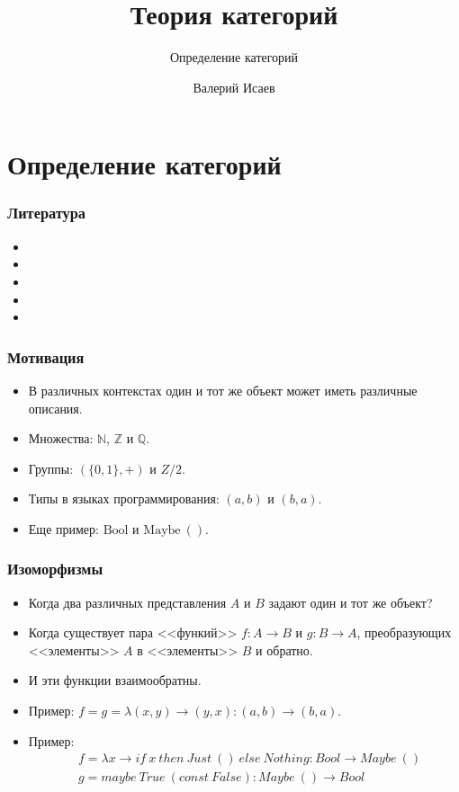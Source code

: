 \documentclass{beamer}
\newcommand{\fs}[1]{\mathrm{#1}}
\begin{document}
\title{Теория категорий}
\subtitle{Определение категорий}
\author{Валерий Исаев}
\maketitle

\section{Определение категорий}

\begin{frame}

\frametitle{Литература}
\begin{itemize}
\item {}
\item {}
\item {}
\item {}
\item {}
\end{itemize}
\end{frame}

\begin{frame}
\frametitle{Мотивация}
\begin{itemize}
\item В различных контекстах один и тот же объект может иметь различные описания.
\item Множества: $\mathbb{N}$, $\mathbb{Z}$ и $\mathbb{Q}$.
\item Группы: $(\{ 0, 1 \}, +)$ и $Z/2$.
\item Типы в языках программирования: $(a, b)$ и $(b, a)$.
\item Еще пример: $\fs{Bool}$ и $\fs{Maybe\ ()}$.
\end{itemize}
\end{frame}

\begin{frame}
\frametitle{Изоморфизмы}
\begin{itemize}
\item Когда два различных представления $A$ и $B$ задают один и тот же объект?
\item Когда существует пара <<функий>> $f : A \to B$ и $g : B \to A$, преобразующих <<элементы>> $A$ в <<элементы>> $B$ и обратно.
\item И эти функции взаимообратны.
\item Пример: $f = g = \lambda (x, y) \to (y, x) : (a, b) \to (b, a)$.
\item Пример:
\begin{align*}
& f = \lambda x \to if\ x\ then\ Just\ ()\ else\ Nothing : Bool \to Maybe\ () \\
& g = maybe\ True\ (const\ False) : Maybe\ () \to Bool
\end{align*}
\end{itemize}
\end{frame}
\end{document}
